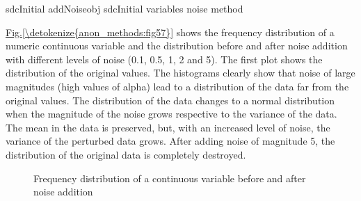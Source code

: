 \documentclass[letterpaper,10pt,english]{sphinxmanual}
\begin{document}
\def\sphinxLiteralBlockLabel{\label{\detokenize{anon_methods:code519}}}
%
\begin{sphinxVerbatim}[commandchars=\\\{\},numbers=left,firstnumber=1,stepnumber=1]
 sdcInitial  addNoiseobj  sdcInitial variables                  noise   method  
\end{sphinxVerbatim}

\hyperref[\detokenize{anon_methods:fig57}]{Fig.\@ \ref{\detokenize{anon_methods:fig57}}} shows the frequency distribution of a numeric continuous
variable and the distribution before and after noise addition with
different levels of noise (0.1, 0.5, 1, 2 and 5). The first plot shows
the distribution of the original values. The histograms clearly show
that noise of large magnitudes (high values of alpha) lead to a
distribution of the data far from the original values. The distribution
of the data changes to a normal distribution when the magnitude of the
noise grows respective to the variance of the data. The mean in the data
is preserved, but, with an increased level of noise, the variance of the
perturbed data grows. After adding noise of magnitude 5, the
distribution of the original data is completely destroyed.

\begin{figure}[htbp]
\centering
\capstart

\noindent{}
\caption{Frequency distribution of a continuous variable before and after noise addition}\label{\detokenize{anon_methods:fig57}}\label{\detokenize{anon_methods:id42}}\end{figure}
\end{document}

